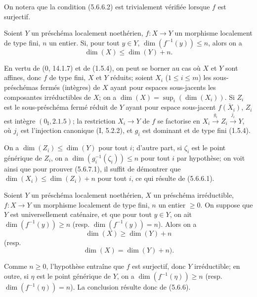 On notera que la condition (5.6.6.2) est trivialement vérifiée lorsque $f$
est surjectif.

\begin{corollary}[5.6.7]
\label{IV.2.s5.6.7-fr}
Soient $Y$ un préschéma localement noethérien, $f:X\to Y$ un morphisme
localement de type fini, $n$ un entier. Si, pour tout $y\in Y$,
$\dim(f^{-1}(y))\leq n$, alors on a
\begin{equation}
\dim(X)\leq\dim(Y)+n.
\tag{5.6.7.1}\label{IV.2.s5.6.7.1-fr}
\end{equation}
\end{corollary}

En vertu de (0, 14.1.7) et de (1.5.4), on peut se borner au cas où $X$ et
$Y$ sont affines, donc $f$ de type fini, $X$ et $Y$ réduits; soient $X_i$
($1\leq i\leq m$) les sous-préschémas fermés (intègres) de $X$ ayant pour
espaces sous-jacents les composantes irréductibles de $X$; on a
$\dim(X)=\sup_i(\dim(X_i))$. Si $Z_i$ est le sous-préschéma fermé réduit de
$Y$ ayant pour espace sous-jacent $\overline{f(X_i)}$, $Z_i$ est intègre
$(0_{\mathrm I},2.1.5)$; la restriction $X_i\to Y$ de $f$ se factorise en
$X_i\xrightarrow{g_i}Z_i\xrightarrow{j_i}Y$, où $j_i$ est l'injection
canonique (I, 5.2.2), et $g_i$ est dominant et de type fini (1.5.4).


On a $\dim(Z_i)\leq\dim(Y)$ pour tout $i$; d'autre part, si $\zeta_i$ est le
point générique de $Z_i$, on a $\dim(g_i^{-1}(\zeta_i))\leq n$ pour tout $i$
par hypothèse; on voit ainsi que pour prouver (5.6.7.1), il suffit de
démontrer que $\dim(X_i)\leq\dim(Z_i)+n$ pour tout $i$, ce qui résulte de
(5.6.6.1).

\begin{corollary}[5.6.8]
\label{IV.2.s5.6.8-fr}
Soient $Y$ un préschéma localement noethérien, $X$ un préschéma
irréductible, $f:X\to Y$ un morphisme localement de type fini, $n$ un entier
$\geq0$. On suppose que $Y$ est universellement caténaire, et que pour tout
$y\in Y$, on ait $\dim(f^{-1}(y))\geq n$ (resp.
$\dim(f^{-1}(y))=n$). Alors on a
\begin{equation}
\dim(X)\geq\dim(Y)+n
\tag{5.6.8.1}\label{IV.2.s5.6.8.1-fr}
\end{equation}
(resp.
\begin{equation}
\dim(X)=\dim(Y)+n).
\tag{5.6.8.2}\label{IV.2.s5.6.8.2-fr}
\end{equation}
\end{corollary}

Comme $n\geq0$, l'hypothèse entraîne que $f$ est surjectif, donc $Y$
irréductible; en outre, si $\eta$ est le point générique de $Y$, on a
$\dim(f^{-1}(\eta))\geq n$ (resp. $\dim(f^{-1}(\eta))=n$). La conclusion
résulte donc de (5.6.6).


